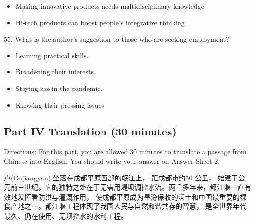 \documentclass[UTF8,11pt]{ctexart}
\begin{document}
\begin{itemize}[leftmargin=2em,itemsep=.2em,topsep=.4em]\item[C.] Making innovative products needs multidisciplinary knowledge
\item[D.] Hi-tech products can boost people's integrative thinking
\end{itemize}

55. What is the author's suggestion to those who are seeking employment?


\begin{itemize}[leftmargin=2em,itemsep=.2em,topsep=.4em]\item[A.] Leaming practical skills.
\item[B.] Broadening their interests.
\item[C.] Staying sae in the pandemic.
\item[D.] Knowing their pressing issues
\end{itemize}

\subsection*{Part IV Translation (30 minutes)}


Directions: For this part, you are allowed 30 minutes to translate a passage from Chinese into English. You should write your answer on Answer Sheet 2.


卢(Dujiangyan) 坐落在成都平原西部的氓江上， 距成都市约50 公里， 始建于公元前三世纪。它的独特之处在于无需用堤坝调控水流。两千多年来，都江堰一直有效地发挥看防洪与灌溉作用， 使成都平原成为旱滂保收的沃土和中国最重要的棵食产地之一。都江堰工程体现了我国人民与自然和谐共存的智慧， 是全世界年代最久、仍在使用、无坝控水的水利工程。
\end{document}

